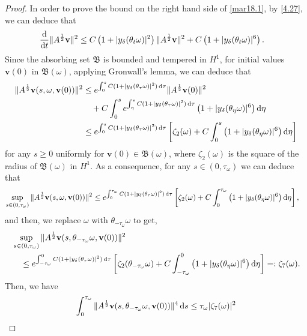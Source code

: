 \documentclass{elsarticle}
\theoremstyle{definition}
\numberwithin{equation}{section}
\renewcommand{\d}{{\rm{d}}}
\begin{document}
\begin{proof}
 In order to prove the bound on the right hand side of \eqref{mar18.1}, by \eqref{4.27}, we can deduce that
\begin{align*}
\frac{\d}{\d t}\|A^{\frac12}\textbf{v}\|^2
&\leq    C\left ( 1 +  |y_\delta(\theta_t\omega)|^2 \right)  \|A^{\frac12}\textbf{v}\|^2  +
C \left(1 +|y_\delta(\theta_t\omega)|^6  \right) .
\end{align*}
Since the absorbing set $\mathfrak B $ is bounded and tempered in $H^1$, for  initial values $\textbf{v}(0)$ in   $\mathfrak B(\omega)$, applying  Gronwall's lemma, we can  deduce that
\begin{align*}
 \|A^{\frac12}\textbf{v}(s,\omega, \textbf{v}(0))\|^2
&\leq e^{ \int_0^s C(1+|y_\delta(\theta_\tau\omega)|^2)\, \d \tau}\|A^{\frac12}\textbf{v}( 0)\|^2
\\
&\quad +C\int_0^s e^{ \int_\eta^s C(1+ |y_\delta (\theta_\tau\omega)|^2)\, \d \tau} \left (1 +|y_\delta(\theta_\eta\omega)|^6 \right) \d \eta \\
&\leq e^{ \int_0^s C(1+|y_\delta(\theta_\tau\omega)|^2)\, \d \tau}
\left[ \zeta_2(\omega)+C\int_0^s   \left (1 +|y_\delta(\theta_\eta\omega)|^6 \right) \d \eta \right]
\end{align*}
for any $s\geq 0$ uniformly for $\textbf{v}(0)\in  \mathfrak B(\omega)$,   where $\zeta_2(\omega) $ is the square of the radius of $\mathfrak B(\omega)$ in $H^1$. As a consequence,  for any $s\in (0, \tau_\omega)$ we can deduce that
\begin{align*}
  \sup_{s\in (0, \tau_\omega)} \|A^{\frac12}\textbf{v}(s,\omega, \textbf{v}(0))\|^2
&\leq e^{ \int_0^{\tau_\omega}  C(1+|y_\delta(\theta_\tau\omega)|^2)\, \d \tau}
\left[\zeta_2(\omega)+C\int_0^{\tau_\omega}   \left (1 +|y_\delta(\theta_\eta\omega)|^6 \right) \d \eta \right] ,
\end{align*}
and then, we replace $\omega $ with $ \theta_{-\tau_\omega} \omega$ to get,
\begin{align*}
&  \sup_{s\in (0, \tau_\omega)} \|A^{\frac12}\textbf{v}(s, \theta_{-\tau_\omega} \omega, \textbf{v}(0))\|^2 \\
&\quad \leq e^{ \int^0_{-\tau_\omega}  C(1+|y_\delta(\theta_\tau\omega)|^2)\, \d \tau}
\left[ \zeta_2( \theta_{-\tau_\omega}\omega)+C\int^0_{-\tau_\omega}   \left (1 +|y_\delta(\theta_\eta\omega)|^6 \right) \d \eta \right] =: \zeta_7(\omega) .
\end{align*}
 Then, we have
\begin{align}\label{5.8}
    \int_{0}^{\tau_\omega}  \|A^\frac12\textbf{v}(s, \theta_{-\tau_\omega}\omega, \textbf{v}(0)) \|^4 \, \d s  \leq  \tau_\omega |\zeta_7(\omega)|^2

\end{align}
\end{proof}
\end{document}
